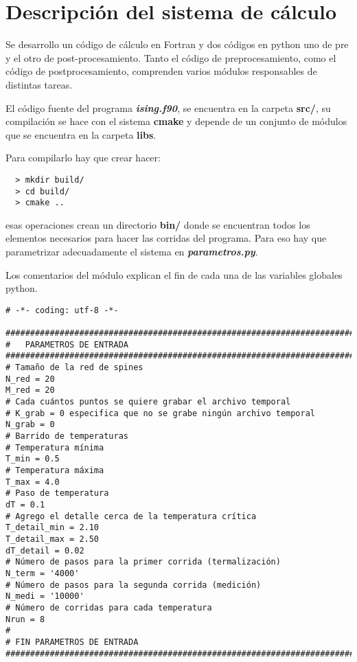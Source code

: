 \section{Descripci\'on del sistema de c\'alculo}


Se desarrollo un c\'odigo de c\'alculo en Fortran y dos c\'odigos
en python uno  de pre y el otro de post-procesamiento. Tanto el código de preprocesamiento, 
como el código de postprocesamiento, comprenden varios módulos responsables de distintas
tareas.

El c\'odigo fuente del programa \textbf{\textit{ising.f90}}, se encuentra en la carpeta
\textbf{src/}, su compilación se hace con el sistema \textbf{cmake} y depende
de un conjunto de módulos que se encuentra en la carpeta \textbf{libs}.

Para compilarlo hay que crear hacer:

\begin{verbatim}
  > mkdir build/
  > cd build/
  > cmake ..
\end{verbatim}

esas operaciones crean un directorio \textbf{bin/} donde se encuentran todos
los elementos necesarios para hacer las corridas del programa.
Para eso hay que parametrizar adecuadamente el sistema en \textbf{\textit{parametros.py}}.

Los comentarios del módulo explican el fin de cada una de las variables globales python.

\begin{verbatim}
# -*- coding: utf-8 -*-

###############################################################################       
#   PARAMETROS DE ENTRADA
###############################################################################
# Tamaño de la red de spines
N_red = 20
M_red = 20
# Cada cuántos puntos se quiere grabar el archivo temporal
# K_grab = 0 especifica que no se grabe ningún archivo temporal
N_grab = 0     
# Barrido de temperaturas
# Temperatura mínima
T_min = 0.5
# Temperatura máxima
T_max = 4.0
# Paso de temperatura
dT = 0.1
# Agrego el detalle cerca de la temperatura crítica
T_detail_min = 2.10
T_detail_max = 2.50
dT_detail = 0.02
# Número de pasos para la primer corrida (termalización)
N_term = '4000'
# Número de pasos para la segunda corrida (medición)
N_medi = '10000'
# Número de corridas para cada temperatura
Nrun = 8
#
# FIN PARAMETROS DE ENTRADA
###############################################################################

\end{verbatim}


